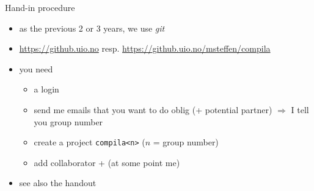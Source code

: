 \documentclass{beamer}
\begin{document}
\begin{frame}[label={sec:org84aa355},fragile]{Hand-in procedure}
 \begin{itemize}
\item as the previous 2 or 3 years, we use  \emph{git}

\item \url{https://github.uio.no} resp. \url{https://github.uio.no/msteffen/compila}

\item you need

\begin{itemize}
\item a login
\item send me emails that you want to do oblig (+ potential partner)
\(\Rightarrow\) I tell you group number
\item create a project \texttt{compila<n>} (\(n\) = group number)
\item add collaborator + (at some point me)
\end{itemize}
\end{itemize}


\begin{itemize}
\item see also the handout
\end{itemize}
\end{frame}






\end{document}
